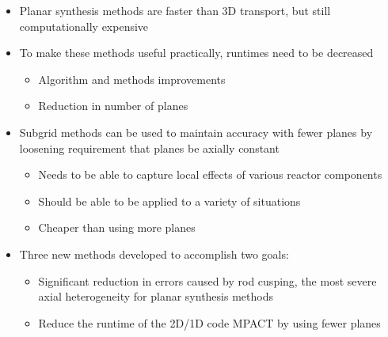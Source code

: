 \begin{frame}
    
    \begin{itemize}
        \item Planar synthesis methods are faster than 3D transport, but still computationally expensive
        \item To make these methods useful practically, runtimes need to be decreased
        \begin{itemize}
            \item Algorithm and methods improvements
            \item Reduction in number of planes
        \end{itemize}
        \item Subgrid methods can be used to maintain accuracy with fewer planes by loosening requirement that planes be axially constant
        \begin{itemize}
            \item Needs to be able to capture local effects of various reactor components
            \item Should be able to be applied to a variety of situations
            \item Cheaper than using more planes
        \end{itemize}
        \item Three new methods developed to accomplish two goals:
        \begin{itemize}
            \item Significant reduction in errors caused by rod cusping, the most severe axial heterogeneity for planar synthesis methods
            \item Reduce the runtime of the 2D/1D code MPACT by using fewer planes
        \end{itemize}
    \end{itemize}

\end{frame}